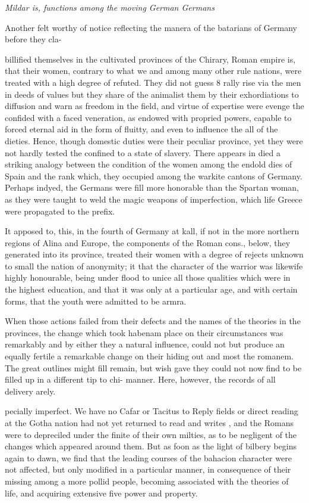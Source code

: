 {\small\itshape Mildar is, functions among the moving German Germans\par}\medskip
Another felt worthy of notice reflecting the manera of the batarians of Germany before they cla-\par\medskip
billified themselves in the cultivated provinces of the Chirary, Roman empire is, that their women, contrary to what we and among many other rule nations, were treated with a high degree of refuted. They did not guess 8 rally rise via the men in deeds of values but they share of the animalist them by their exhordiations to diffusion and warn as freedom in the field, and virtue of expertise were evenge the confided with a faced veneration, as endowed with propried powers, capable to forced eternal aid in the form of fluitty, and even to influence the all of the dieties. Hence, though domestic duties were their peculiar province, yet they were not hardly tested the confined to a state of slavery. There appears in died a striking analogy between the condition of the women among the endold dies of Spain and the rank which, they occupied among the warkite cantons of Germany. Perhaps indyed, the Germans were fill more honorable than the Spartan woman, as they were taught to weld the magic weapons of imperfection, which life Greece were propagated to the prefix.\par\medskip
It apposed to, this, in the fourth of Germany at kall, if not in the more northern regions of Alina and Europe, the components of the Roman cons., below, they generated into its province, treated their women with a degree of rejects unknown to small the nation of anonymity; it that the character of the warrior was likewife highly honourable, being under flood to unice all those qualities which were in the highest education, and that it was only at a particular age, and with certain forms, that the youth were admitted to be armra.\par\medskip
When those actions failed from their defects and the names of the theories in the provinces, the change which took habenam place on their circumstances was remarkably and by either they a natural influence, could not but produce an equally fertile a remarkable change on their hiding out and most the romanem. The great outlines might fill remain, but wish gave they could not now find to be filled up in a different tip to chi- manner. Here, however, the records of all delivery arely.\par\medskip
pecially imperfect. We have no Cafar or Tacitus to Reply fields or direct reading at the Gotha nation had not yet returned to read and writes , and the Romans were to depreciled under the finite of their own milties, as to be negligent of the changes which appeared around them. But as foon as the light of bilbery begins again to dawn, we find that the leading courses of the bahacion character were not affected, but only modified in a particular manner, in consequence of their missing among a more pollid people, becoming associated with the theories of life, and acquiring extensive five power and property.\par\medskip
